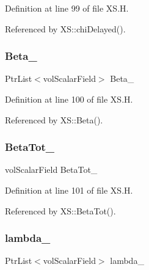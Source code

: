 Definition at line 99 of file X\+S.\+H.



Referenced by X\+S\+::chi\+Delayed().

\mbox{\label{classFoam_1_1XS_a7f7fe9267b6666b38fa5534851251f7b}} 
\subsubsection{\texorpdfstring{Beta\+\_\+}{Beta\_}}
{\footnotesize\ttfamily Ptr\+List$<$vol\+Scalar\+Field$>$ Beta\+\_\+\hspace{0.3cm}{\ttfamily [protected]}}



Definition at line 100 of file X\+S.\+H.



Referenced by X\+S\+::\+Beta().

\mbox{\label{classFoam_1_1XS_aada58fbe9089eb21ee65471a6e424c93}} 
\subsubsection{\texorpdfstring{Beta\+Tot\+\_\+}{BetaTot\_}}
{\footnotesize\ttfamily vol\+Scalar\+Field Beta\+Tot\+\_\+\hspace{0.3cm}{\ttfamily [protected]}}



Definition at line 101 of file X\+S.\+H.



Referenced by X\+S\+::\+Beta\+Tot().

\mbox{\label{classFoam_1_1XS_a5c475176377784b2717714cb353fa3c0}} 
\subsubsection{\texorpdfstring{lambda\+\_\+}{lambda\_}}
{\footnotesize\ttfamily Ptr\+List$<$vol\+Scalar\+Field$>$ lambda\+\_\+\hspace{0.3cm}{\ttfamily [protected]}}



